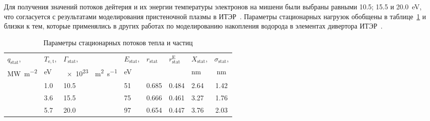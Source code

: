 Для получения значений потоков дейтерия и их энергии температуры электронов на мишени были выбраны равными \num{10.5}; \num{15.5} и \SI{20.0}{\electronvolt}, что согласуется с результатами моделирования пристеночной плазмы в ИТЭР~\cite{Pitts2019, Orrico2023}. Параметры стационарных нагрузок обобщены в таблице~\ref{tab:stat_exposure} и близки к тем, которые применялись в других работах по моделированию накопления водорода в элементах дивертора ИТЭР~\cite{Delaporte-Mathurin2019, Delaporte-Mathurin2021_3, Delaporte-Mathurin2020, Delaporte-Mathurin2023, Hodille2021_2}.
\begin{table}[ht]
	\centering
	\caption{Параметры стационарных потоков тепла и частиц} \label{tab:stat_exposure}
	\begin{threeparttable}
		\renewcommand{\arraystretch}{1.2}%
		\begin{tabularx}{\linewidth}{>{\centering\arraybackslash}X>{\centering\arraybackslash}X>{\centering\arraybackslash}X>{\centering\arraybackslash}X>{\centering\arraybackslash}X>{\centering\arraybackslash}X>{\centering\arraybackslash}Xc}
			\toprule
			$q_{\mathrm{stat}}$,
			   & $T_{\mathrm{e,t}}$,
			   & $\Gamma_{\mathrm{stat}}$,
			   & $E_{\mathrm{stat}}$,
			   & $r_{\mathrm{stat}}$
			   & $r_{\mathrm{stat}}^{\mathrm{E}}$
			   & $X_{\mathrm{stat}}$,
			   & $\sigma_{\mathrm{stat}}$,                                                                                             \\
			\si{\mega\watt\per\meter\squared}
			   & \si{\electronvolt}
			   & \SI{e23}{\per\meter\squared\per\second}
			   & \si{\electronvolt}
			   &
			   &
			   & \si{\nano\meter}
			   & \si{\nano\meter}                                                                                                      \\
			\hline
			\hline
			1  & \num{1.0}                               & \num{10.5} & \num{51} & \num{0.685} & \num{0.484} & \num{2.64} & \num{1.42} \\
			5  & \num{3.6}                               & \num{15.5} & \num{75} & \num{0.666} & \num{0.461} & \num{3.27} & \num{1.76} \\
			10 & \num{5.7}                               & \num{20.0} & \num{97} & \num{0.654} & \num{0.447} & \num{3.76} & \num{2.03} \\
			\bottomrule
		\end{tabularx}
	\end{threeparttable}
\end{table}

